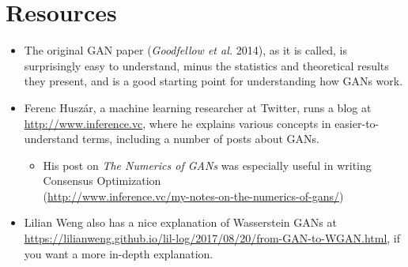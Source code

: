 \documentclass{article}
\begin{document}
\section{Resources}
\begin{itemize}

\item{The original GAN paper (\textit{Goodfellow et al.} 2014), as it is called, is surprisingly easy to understand, minus the statistics and theoretical results they present, and is a good starting point for understanding how GANs work.}

\item{Ferenc Huszár, a machine learning researcher at Twitter, runs a blog at \url{http://www.inference.vc}, where he explains various concepts in easier-to-understand terms, including a number of posts about GANs.
  \begin{itemize}
     \item{His post on \textit{The Numerics of GANs} was especially useful in writing Consensus Optimization \\ (\url{http://www.inference.vc/my-notes-on-the-numerics-of-gans/})}
  \end{itemize}
}

\item{Lilian Weng also has a nice explanation of Wasserstein GANs at \url{https://lilianweng.github.io/lil-log/2017/08/20/from-GAN-to-WGAN.html}, if you want a more in-depth explanation.}

\end{itemize}
\end{document}
